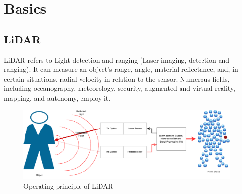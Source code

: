 \chapter{Basics}

\section{LiDAR}
LiDAR refers to Light detection and ranging (Laser imaging, detection and ranging). It can measure an object's range, angle, material reflectance, and, in certain situations, radial velocity in relation to the sensor. Numerous fields, including oceanography, meteorology, security, augmented and virtual reality, mapping, and autonomy, employ it.
\begin{figure}[htbp]
    \centering
    \includegraphics[width=0.8\linewidth]{97_graphics/related_work/lidar_principle.pdf}
    \caption{Operating principle of LiDAR}
    \label{fig:related_work-lidar}
\end{figure}

